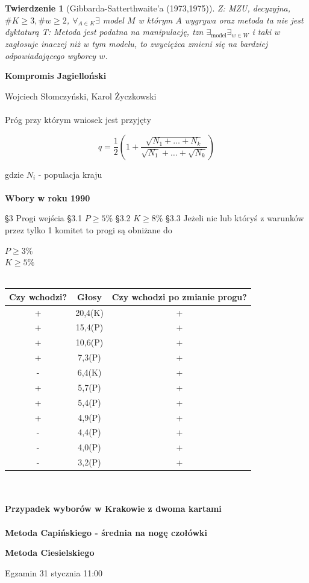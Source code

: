 \documentclass[12pt,a4paper]{article}
\theoremstyle{break}
\newtheorem{theorem}{Twierdzenie}[section]
\begin{document}
	\begin{theorem}[Gibbarda-Satterthwaite'a (1973,1975)]
		Z: MZU, decyzyjna, $\# K \geq 3, \# w \geq 2$, $\forall_{A\in K} \exists$ model $M$ w którym $A$ wygrywa oraz metoda ta nie jest dyktaturą
		T: Metoda jest podatna na manipulację, tzn 	$\exists_{ \text{model}} \exists_{w \in W}$ i taki $w$ zagłosuje inaczej niż w tym modelu, to zwyciężca zmieni się na bardziej odpowiadającego wyborcy $w$.
	\end{theorem}
	
	{\textbf{Kompromis Jagielloński}}
	
	Wojciech Słomczyński, Karol Życzkowski\\\\
	
	Próg przy którym wniosek jest przyjęty
	
	$$q=\frac{1}{2} \left(1+\frac{\sqrt{N_1+\dots+N_k}}{\sqrt{N_1}+\dots+\sqrt{N_k}}\right)$$ 
	
	gdzie $N_i$ - populacja kraju\\\\
	
	{\textbf{Wbory w roku 1990}}
	
	§3 Progi wejścia
	§3.1 $P\geq 5\%$
	§3.2 $K\geq 8\%$
	§3.3 Jeżeli nic lub któryś z warunków przez tylko 1 komitet to progi są obniżane do 
	
	$P\geq 3\%$\\
	$K\geq 5\%$\\\\
	
	\begin{tabular}{|c|c|c|}\hline
		Czy wchodzi? & Głosy & Czy wchodzi po zmianie progu?\\\hline
		+&20,4(K)&+\\\hline
		+&15,4(P)&+\\\hline
		+&10,6(P)&+\\\hline
		+&7,3(P)&+\\\hline
		-&6,4(K)&+\\\hline
		+&5,7(P)&+\\\hline
		+&5,4(P)&+\\\hline
		+&4,9(P)&+\\\hline
		-&4,4(P)&+\\\hline
		-&4,0(P)&+\\\hline
		-&3,2(P)&+\\\hline
		
	\end{tabular}\\\\
	
		{\textbf{Przypadek wyborów w Krakowie z dwoma kartami}}\\\\
		
		{\textbf{Metoda Capińskiego - średnia na nogę czołówki}}
		
		{\textbf{Metoda Ciesielskiego}}
	\begin{center}
		{\fontsize{30}{36}\selectfont\faBirthdayCake}
	\end{center} 
	
	Egzamin 31 stycznia 11:00
	
		
	
	

	
	
\end{document}
